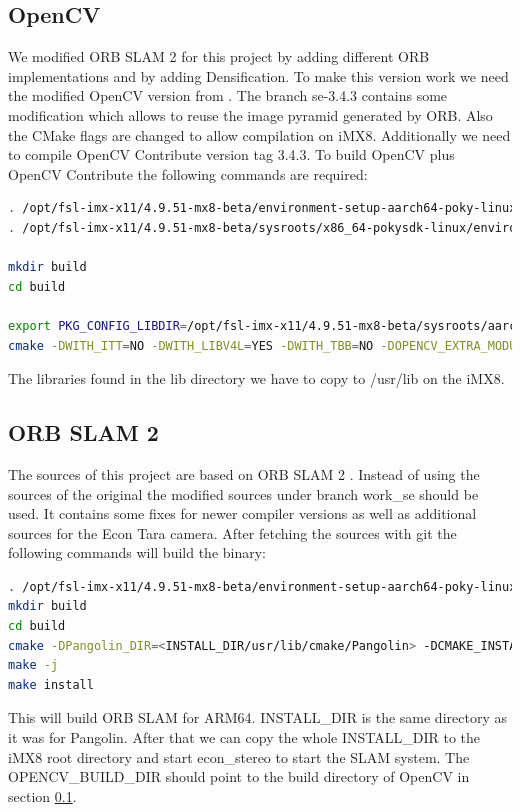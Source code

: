 \documentclass[11pt,a4paper,titlepage,oneside]{report}
\begin{document}
\subsection{OpenCV}\label{sec:opencv}
We modified ORB SLAM 2 for this project by adding different ORB implementations and by adding Densification. To make this version work we need the modified OpenCV version from \cite{opencv_se}. The branch se-3.4.3 contains some modification which allows to reuse the image pyramid generated by ORB. Also the CMake flags are changed to allow compilation on iMX8. Additionally we need to compile OpenCV Contribute \cite{opencv_contrib} version tag 3.4.3. To build OpenCV plus OpenCV Contribute the following commands are required:
\begin{lstlisting}[language=bash]
. /opt/fsl-imx-x11/4.9.51-mx8-beta/environment-setup-aarch64-poky-linux
. /opt/fsl-imx-x11/4.9.51-mx8-beta/sysroots/x86_64-pokysdk-linux/environment-setup.d/cmake.sh

mkdir build
cd build

export PKG_CONFIG_LIBDIR=/opt/fsl-imx-x11/4.9.51-mx8-beta/sysroots/aarch64-poky-linux/usr/lib/pkgconfig/
cmake -DWITH_ITT=NO -DWITH_LIBV4L=YES -DWITH_TBB=NO -DOPENCV_EXTRA_MODULES_PATH=<path to OpenCV contrib> -DCMAKE_BUILD_TYPE=Release ..
\end{lstlisting}

The libraries found in the lib directory we have to copy to /usr/lib on the iMX8.

\subsection{ORB SLAM 2}
The sources of this project are based on ORB SLAM 2 \cite{orbslam2_impl}. Instead of using the sources of the original the modified sources \cite{orbslam2_se} under branch work\_se should be used. It contains some fixes for newer compiler versions as well as additional sources for the Econ Tara camera. After fetching the sources with git the following commands will build the binary:\\
\begin{lstlisting}[language=bash]
. /opt/fsl-imx-x11/4.9.51-mx8-beta/environment-setup-aarch64-poky-linux
mkdir build
cd build
cmake -DPangolin_DIR=<INSTALL_DIR/usr/lib/cmake/Pangolin> -DCMAKE_INSTALL_PREFIX=<INSTALL_DIR> -DOpenCV_DIR:PATH=<OPENCV_BUILD_DIR> ..
make -j
make install
\end{lstlisting}

This will build ORB SLAM for ARM64. INSTALL\_DIR is the same directory as it was for Pangolin. After that we can copy the whole INSTALL\_DIR to the iMX8 root directory and start econ\_stereo to start the SLAM system. The OPENCV\_BUILD\_DIR should point to the build directory of OpenCV in section \ref{sec:opencv}.
\end{document}
